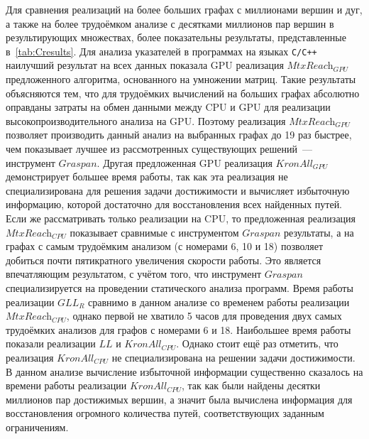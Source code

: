 Для сравнения реализаций на более больших графах с миллионами вершин и дуг, а также на более трудоёмком анализе с десятками миллионов пар вершин в результирующих множествах, более показательны результаты, представленные в~\cref{tab:Cresults}. Для анализа указателей в программах на языках \texttt{C/C++} наилучший результат на всех данных показала GPU реализация $\textit{MtxReach}_{\textit{GPU}}$ предложенного алгоритма, основанного на умножении матриц. Такие результаты объясняются тем, что для трудоёмких вычислений на больших графах абсолютно оправданы затраты на обмен данными между CPU и GPU для реализации высокопроизводительного анализа на GPU. Поэтому реализация $\textit{MtxReach}_{\textit{GPU}}$ позволяет производить данный анализ на выбранных графах до 19 раз быстрее, чем показывает лучшее из рассмотренных существующих решений~--- инструмент $\textit{Graspan}$. Другая предложенная GPU реализация $\textit{KronAll}_{\textit{GPU}}$ демонстрирует большее время работы, так как эта реализация не специализирована для решения задачи достижимости и вычисляет избыточную информацию, которой достаточно для восстановления всех найденных путей. Если же рассматривать только реализации на CPU, то предложенная реализация $\textit{MtxReach}_{\textit{CPU}}$ показывает сравнимые с инструментом $\textit{Graspan}$ результаты, а на графах с самым трудоёмким анализом (с номерами 6, 10 и 18) позволяет добиться почти пятикратного увеличения скорости работы. Это является впечатляющим результатом, с учётом того, что инструмент $\textit{Graspan}$ специализируется на проведении статического анализа программ. Время работы реализации $\textit{GLL}_{\textit{R}}$ сравнимо в данном анализе со временем работы реализации $\textit{MtxReach}_{\textit{CPU}}$, однако первой не хватило 5 часов для проведения двух самых трудоёмких анализов для графов с номерами 6 и 18. Наибольшее время работы показали реализации $\textit{LL}$ и $\textit{KronAll}_{\textit{CPU}}$. Однако стоит ещё раз отметить, что реализация $\textit{KronAll}_{\textit{CPU}}$ не специализирована на решении задачи достижимости. В данном анализе вычисление избыточной информации существенно сказалось на времени работы реализации $\textit{KronAll}_{\textit{CPU}}$, так как были найдены десятки миллионов пар достижимых вершин, а значит была вычислена информация для восстановления огромного количества путей, соответствующих заданным ограничениям.

